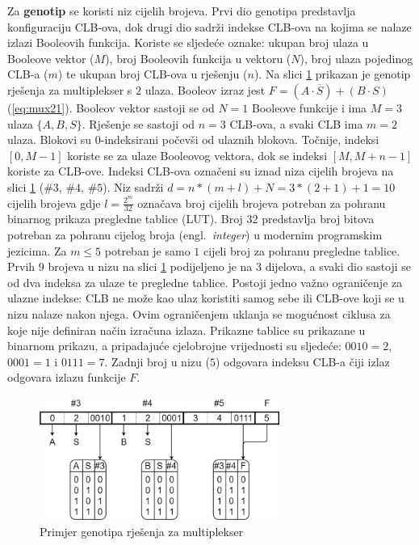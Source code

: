 \documentclass[times, utf8, diplomski]{fer}
\begin{document}
Za \textbf{genotip} se koristi niz cijelih brojeva. Prvi dio genotipa predstavlja konfiguraciju CLB-ova, dok drugi dio sadrži indekse CLB-ova na kojima se nalaze izlazi Booleovih funkcija. Koriste se sljedeće oznake: ukupan broj ulaza u Booleove vektor ($M$), broj Booleovih funkcija u vektoru ($N$), broj ulaza pojedinog CLB-a ($m$) te ukupan broj CLB-ova u rješenju ($n$). Na slici \ref{fig:genotype} prikazan je genotip rješenja za multiplekser s $2$ ulaza. Booleov izraz jest $F = (A \cdot \overline{S}) + (B \cdot S)$ (\ref{eq:mux21}). Booleov vektor sastoji se od $N=1$ Booleove funkcije i ima $M=3$ ulaza $\{A, B, S\}$. Rješenje se sastoji od $n=3$ CLB-ova, a svaki CLB ima $m=2$ ulaza. Blokovi su $0$-indeksirani počevši od ulaznih blokova. Točnije, indeksi $[0, M-1]$ koriste se za ulaze Booleovog vektora, dok se indeksi $[M, M+n-1]$ koriste za CLB-ove. Indeksi CLB-ova označeni su iznad niza cijelih brojeva na slici \ref{fig:genotype} ($\#3$, $\#4$, $\#5$). Niz sadrži $d=n*(m+l)+N=3*(2+1)+1=10$ cijelih brojeva gdje $l=\frac{2^{m}}{32}$ označava broj cijelih brojeva potreban za pohranu binarnog prikaza pregledne tablice (LUT). Broj $32$ predstavlja broj bitova potreban za pohranu cijelog broja (engl.~\textit{integer}) u modernim programskim jezicima. Za $m \leq 5$ potreban je samo $1$ cijeli broj za pohranu pregledne tablice. Prvih $9$ brojeva u nizu na slici \ref{fig:genotype} podijeljeno je na $3$ dijelova, a svaki dio sastoji se od dva indeksa za ulaze te pregledne tablice. Postoji jedno važno ograničenje za ulazne indekse: CLB ne može kao ulaz koristiti samog sebe ili CLB-ove koji se u nizu nalaze nakon njega. Ovim ograničenjem uklanja se mogućnost ciklusa za koje nije definiran način izračuna izlaza. Prikazne tablice su prikazane u binarnom prikazu, a pripadajuće cjelobrojne vrijednosti su sljedeće: $0010=2$, $0001=1$ i $0111=7$. Zadnji broj u nizu ($5$) odgovara indeksu CLB-a čiji izlaz odgovara izlazu funkcije $F$.

\begin{figure}[htb]
	\centering
	\includegraphics[width=0.7\textwidth]{img/genotype.png}
	\caption{Primjer genotipa rješenja za multiplekser}
	\label{fig:genotype}
\end{figure}
\end{document}

